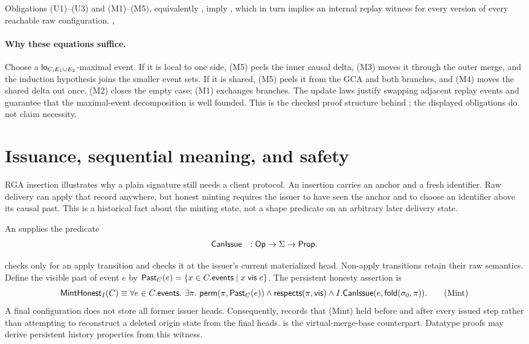 \begin{theorem}
Obligations (U1)--(U3) and (M1)--(M5), equivalently
, imply
, which in turn implies an internal replay witness for every
version of every reachable raw configuration.
\hfill{},
\end{theorem}

\paragraph{Why these equations suffice.}
Choose a $\mathsf{lo}_{C,E_1\cup E_2}$-maximal event. If it is local to one side, (M5)
peels the inner causal delta, (M3) moves it through the outer merge, and the
induction hypothesis joins the smaller event sets. If it is shared, (M5)
peels it from the GCA and both branches, and (M4) moves the shared delta out
once. (M2) closes the empty case; (M1) exchanges branches. The update laws
justify swapping adjacent replay events and guarantee that the maximal-event
decomposition is well founded. This is the checked proof structure behind
; the displayed obligations do not claim
necessity.

\section{Issuance, sequential meaning, and safety}
\label{sec:generation}

RGA insertion illustrates why a plain signature still needs a client
protocol. An insertion carries an anchor and a fresh identifier. Raw delivery
can apply that record anywhere, but honest minting requires the issuer to have
seen the anchor and to choose an identifier above its causal past. This is a
historical fact about the minting state, not a shape predicate on an arbitrary
later delivery state.

\begin{definition}[issuance]
An  supplies the predicate
\[
\begin{array}{ll}
\mathsf{CanIssue} &: \mathsf{Op}\to\Sigma\to\mathsf{Prop}.
\end{array}
\]
\end{definition}

 checks  only for an apply transition and
checks it at the issuer's current materialized head. Non-apply transitions
retain their raw semantics. Define the visible past of event $e$ by
$\mathsf{Past}_C(e)=\{x\in C.\mathsf{events}\mid x\mathrel{\mathsf{vis}} e\}$. The persistent
honesty assertion is
\[
 \mathsf{MintHonest}_I(C)\equiv
 \forall e\in C.\mathsf{events}.\ \exists\pi.\
 \mathsf{perm}(\pi,\mathsf{Past}_C(e))\land
 \mathsf{respects}(\pi,\mathrel{\mathsf{vis}})\land
 I.\mathsf{CanIssue}(e,\mathsf{fold}(\sigma_0,\pi)).
 \tag*{(Mint)}
\]
A final configuration does not store all former issuer heads. Consequently,
\lean{MintCertifiedReach} records that (Mint) held before and after every
issued step rather than attempting to reconstruct a deleted origin state from
the final heads. \lean{MintCertifiedReachV} is the virtual-merge-base counterpart.
Datatype proofs may derive persistent history properties from this witness.

